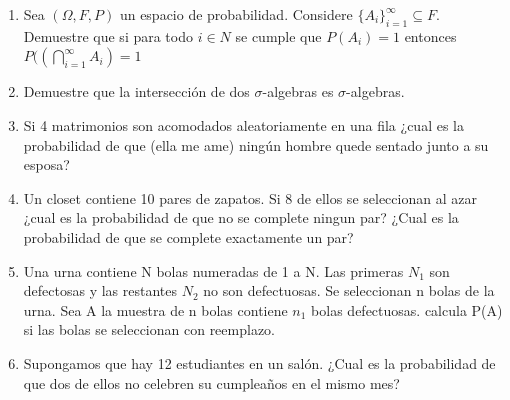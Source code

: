 \documentclass[12pt,a4paper]{report}
\begin{document}
\begin{enumerate}
	
  \item{
 Sea $(\Omega, F, P)$ un espacio de probabilidad. Considere $\lbrace A_{i} \rbrace_{i=1}^{\infty} \subseteq F$. Demuestre que si para todo $i \in N$ se cumple que $P(A_{i})=1$ entonces $P((\bigcap\limits_{i=1}^{\infty}A_{i})=1$
  }
  
  \item{
 Demuestre que la intersección de dos $\sigma$-algebras es $\sigma$-algebras.
  }
  
  
  \item{
Si 4 matrimonios son acomodados aleatoriamente en una fila ¿cual es la probabilidad de que (ella me ame) ningún hombre quede sentado junto a su esposa?
  }
  
  \item{
Un closet contiene 10 pares de zapatos. Si 8 de ellos se seleccionan al azar ¿cual es la probabilidad de que no se complete ningun par? ¿Cual es la probabilidad de que se complete exactamente un par? 
  }
  
  \item{
	Una urna contiene N  bolas numeradas de 1 a N. Las primeras $N_{1}$ son defectosas y las restantes $N_{2}$ no son defectuosas. Se seleccionan n bolas de la urna. Sea A la muestra de n bolas contiene $n_{1}$ bolas defectuosas. calcula P(A) si las bolas se seleccionan con reemplazo. 
  }
  
  \item{
	Supongamos que hay 12 estudiantes en un salón. ¿Cual es la probabilidad de que dos de ellos no celebren su cumpleaños en el mismo mes? 
  }
  
  
  
  
	
\end{enumerate}
\end{document}
